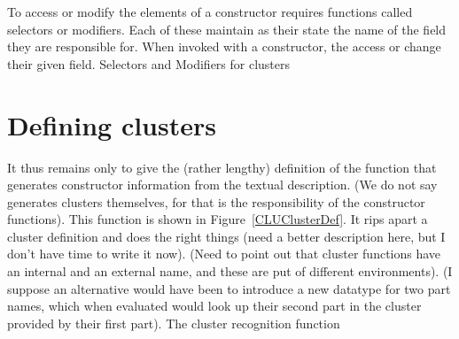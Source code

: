 To access or modify the elements of a constructor requires functions called
selectors or modifiers.  Each of these maintain as their state the name of the
field they are responsible for.  When invoked with a constructor, the access or
change their given field.
%
{Selectors and Modifiers for clusters}

\section{Defining clusters}

It thus remains only to give the (rather lengthy) definition of the function
that generates constructor information from the textual description.  (We do not
say generates clusters themselves, for that is the responsibility of the
constructor functions).  This function is shown in Figure~\ref{CLUClusterDef}.
It rips apart a cluster definition and does the right things (need a better
description here, but I don't have time to write it now).  (Need to point out
that cluster functions have an internal and an external name, and these are put
of different environments).  (I suppose an alternative would have been to
introduce a new datatype for two part names, which when evaluated would look up
their second part in the cluster provided by their first part).
%
{The cluster recognition function}
